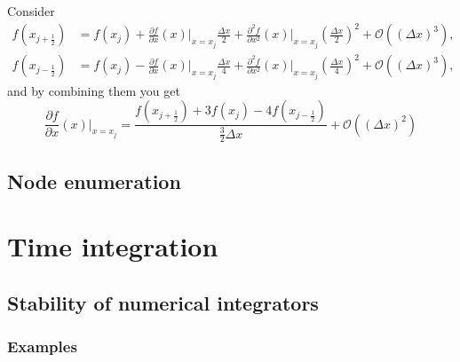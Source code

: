 \documentclass[a4paper,11pt ]{report}
\theoremstyle{definition}
\begin{document}
Consider 
\begin{align*}
f(x_{j+\frac{1}{2}})&=f(x_j)+\frac{\partial f}{\partial x}(x)\bigg|_{x=x_j}\frac{\Delta x}{2}+\frac{\partial^2 f}{\partial x^2}(x)\bigg|_{x=x_j}\left( \frac{\Delta x}{2}\right)^2+\mathcal{O}((\Delta x)^3),\\
f(x_{j-\frac{1}{2}})&=f(x_j)-\frac{\partial f}{\partial x}(x)\bigg|_{x=x_j}\frac{\Delta x}{4}+\frac{\partial^2 f}{\partial x^2}(x)\bigg|_{x=x_j}\left( \frac{\Delta x}{4}\right)^2+\mathcal{O}((\Delta x)^3),
\end{align*}
and by combining them you get
\begin{equation*}
\frac{\partial f}{\partial x}(x)\bigg|_{x=x_j}=\frac{f(x_{j+\frac{1}{2}})+3f(x_j)-4f(x_{j-\frac{1}{2}})}{\frac{3}{2}\Delta x}+\mathcal{O}((\Delta x)^2)
\end{equation*}



\section{Node enumeration}

\chapter{Time integration}

\section{Stability of numerical integrators}

\subsection{Examples}
\end{document}
